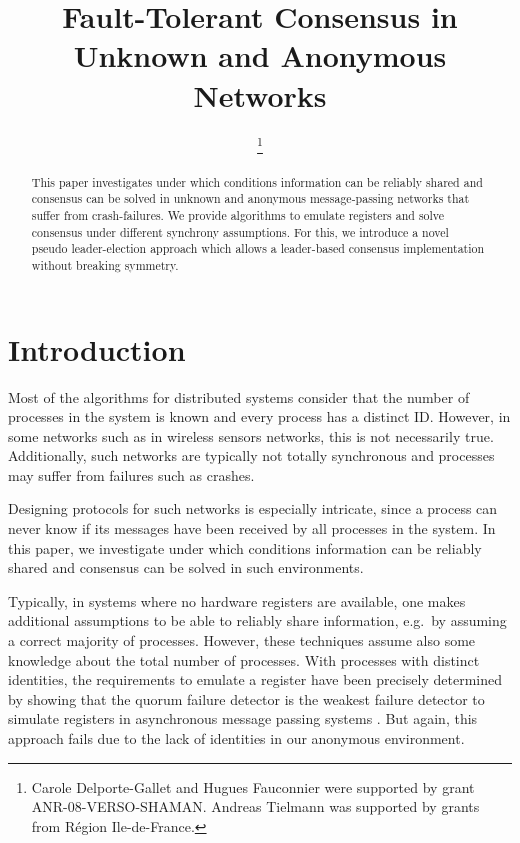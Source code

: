 \documentclass[conference, compsoc]{IEEEtran}
\begin{document}
\title{Fault-Tolerant Consensus in Unknown and Anonymous Networks}



\IEEEoverridecommandlockouts

\author{
	\thanks{Carole Delporte-Gallet and Hugues Fauconnier were supported by grant ANR-08-VERSO-SHAMAN. Andreas Tielmann was supported by grants from R\'egion Ile-de-France.}
}



\maketitle


\begin{abstract}
This paper investigates under which conditions information can be reliably shared and consensus can be solved in unknown and anonymous message-passing networks that suffer from crash-failures.  We provide algorithms to emulate registers and solve consensus under different synchrony assumptions. For this, we introduce a novel pseudo leader-election approach which allows a leader-based consensus implementation without breaking symmetry. 

\end{abstract}



\section{Introduction}

Most of the algorithms for distributed systems consider that the number of processes in the system is known and every process has a distinct ID. However, in some networks such as in wireless sensors networks, this is not necessarily true. Additionally, such networks are typically not totally synchronous and processes may suffer from failures such as crashes.

Designing protocols for such networks is especially intricate, since a process can never know if its messages have been received by all processes in the system. In this paper, we investigate under which conditions information can be reliably shared and consensus can be solved in such environments.   

Typically, in systems where no hardware registers are available, one makes additional assumptions to be able to reliably share information, e.g.~by assuming a correct majority of processes. However, these techniques assume also some knowledge about the total number of processes. With processes with distinct identities, the requirements to emulate a register have been precisely determined by showing that the quorum failure detector  is the weakest failure detector to simulate registers in asynchronous message passing systems \cite{200377/IC}. But again, this approach fails due to the lack of identities in our anonymous environment.
\end{document}
